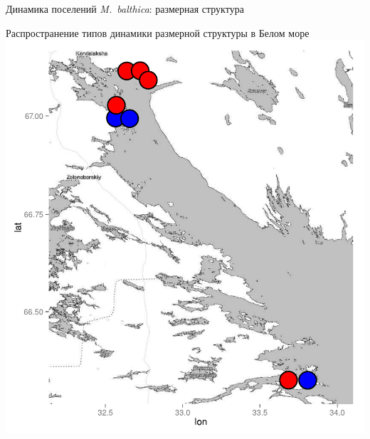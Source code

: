 \documentclass{beamer}
\begin{document}
\begin{frame}{Динамика поселений {\it M.~balthica}: размерная структура}
\begin{minipage}[t]{.53\linewidth}
\begin{center}
			{\scriptsize Распространение типов динамики размерной структуры в Белом море}\\
			\includegraphics[width=.7\textwidth]{map_size_distr.pdf}\\
		\end{center}
	\end{minipage}
\end{frame}

\end{document}

